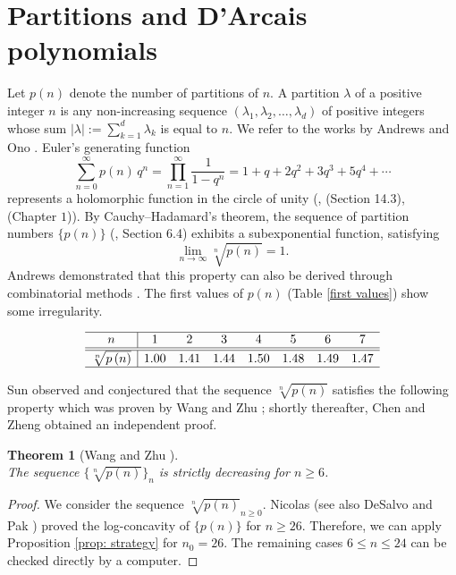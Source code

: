 \documentclass[11pt,reqno]{amsart}
\theoremstyle{plain}
\newtheorem{theorem}{Theorem}[section]
\theoremstyle{remark}
\theoremstyle{definition}
\numberwithin{equation}{section}
\begin{document}
\section{Partitions and D'Arcais
polynomials} \label{Section:Arcais}
Let $p(n)$ denote the number of partitions of $n$. A partition $\lambda$ of a positive integer $n$ is any non-increasing sequence $(\lambda_1, \lambda_2, \ldots, \lambda_d)$ of positive integers whose sum $\vert \lambda\vert:=\sum_{k=1}^{d}\lambda _{k}$ is equal to $n$. We refer to
the works by Andrews
and Ono
\cite{An98, On04}. Euler's generating function
\begin{equation*}
\sum_{n=0}^{\infty} p(n) \, q^n = \prod_{n=1}^{\infty} \frac{1}{1 -q^n} = 1+q+ 2q^2+ 3q^3 + 5q^4+ \cdots
\end{equation*}
represents a holomorphic function in the circle of
unity (\cite{HW60}, \cite{Ap76}(Section 14.3), \cite{Re98} (Chapter $1$)).
By Cauchy--Hadamard's theorem,
the sequence of 
partition numbers $\{p(n)\}$ (\cite{AE04}, Section 6.4)
exhibits a
subexponential function,
satisfying
\begin{equation}\label{lim}
\lim_{n \to \infty} \sqrt[n]{p(n)} = 1.
\end{equation}
Andrews demonstrated
that this property can also
be derived through
combinatorial methods
\cite{An71,AE04}.
The first values of $p(n)$ (Table \ref{first values}) show some irregularity. 
\begin{table}[H]
\[
\begin{array}{c|ccccccc}
\hline
n&1&2&3&4&5&6&7\\ \hline \hline
\sqrt[n]{p\left( n\right)}
&1.00&1.41&1.44&1.50&1.48&1.49 &1.47 \\ \hline
\end{array}
\]
\caption{\label{first values}
Approximative values of $\sqrt[n]{p\left( n\right)}$}
\end{table}
Sun \cite{Su13} observed and conjectured that the 
sequence $\sqrt[n]{p(n)}$ satisfies the following property
which was proven by Wang and Zhu \cite{WZ14}; shortly thereafter,
Chen and Zheng \cite{CZ17} obtained an independent proof.
\begin{theorem}[Wang and Zhu \cite{WZ14}]\ \\
\label{Andrew}The sequence $\{\sqrt[n]{p(n)}\}_n$ is strictly decreasing for $n \geq 6$. 
\end{theorem}
\begin{proof} We consider the sequence $\sqrt[n]{p(n)}_{n\geq 0}$.
Nicolas \cite{Ni78} (see also DeSalvo and Pak \cite{DP15}) proved the log-concavity of $\{p(n)\}$ for $n \geq 26$. Therefore, we can apply
Proposition \ref{prop: strategy} for $n_0=26$. The remaining cases
$ 6 \leq n \leq 24$ can be checked directly by a computer.
\end{proof}
\end{document}
